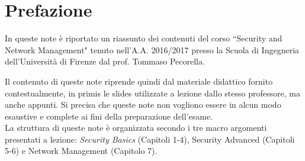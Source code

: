 \chapter*{Prefazione}
In queste note è riportato un riassunto dei contenuti del corso \textquotedblleft Security and Network Management" tenuto nell'A.A. 2016/2017 presso la Scuola di Ingegneria dell'Università di Firenze dal prof. Tommaso Pecorella.

Il contenuto di queste note riprende quindi dal materiale didattico fornito contestualmente, in primis le slides utilizzate a lezione dallo stesso professore, ma anche appunti. Si precisa che queste note non vogliono essere in alcun modo esaustive e complete ai fini della preparazione dell'esame.\\
La struttura di queste note è organizzata secondo i tre macro argomenti presentati a lezione: \textit{Security Basics} (Capitoli 1-4), Security Advanced (Capitoli 5-6) e Network Management (Capitolo 7).
